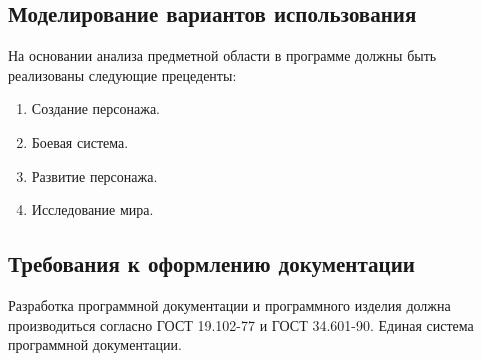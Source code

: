 \subsection{ Моделирование вариантов использования}
На основании анализа предметной области в программе должны быть реализованы следующие прецеденты:
\begin{enumerate}
\item Создание персонажа.
\item Боевая система.
\item Развитие персонажа.
\item Исследование мира.
\end{enumerate}

\subsection{Требования к оформлению документации}

Разработка программной документации и программного изделия должна производиться согласно ГОСТ 19.102-77 и ГОСТ 34.601-90. Единая система программной документации.
